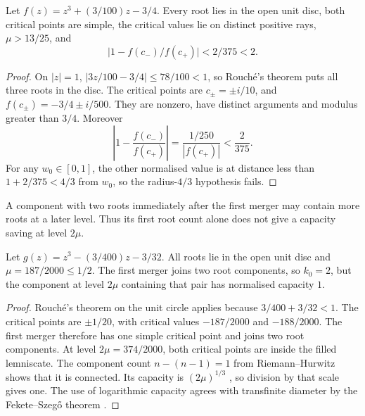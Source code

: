\documentclass[11pt]{article}
\begin{document}
\begin{proposition}
\label{res:sep-or-false}
Let $f(z)=z^3+(3/100)z-3/4$.  Every root lies in the open unit disc, both
critical points are simple, the critical values lie on distinct positive
rays, $\mu>13/25$, and
\[
 \bigl|1-f(c_-)/f(c_+)\bigr|<2/375<2.
\]
\end{proposition}
\begin{proof}
On $|z|=1$, $|3z/100-3/4|\le78/100<1$, so Rouch\'e's theorem puts
all three roots in the disc. The critical points are $c_\pm=\pm i/10$,
and $f(c_\pm)=-3/4\pm i/500$. They are nonzero, have distinct arguments
and modulus greater than $3/4$. Moreover
\[
 \left|1-\frac{f(c_-)}{f(c_+)}\right|
 =\frac{1/250}{|f(c_+)|}<\frac2{375}.
\]
For any $w_0\in[0,1]$, the other normalised value is at distance less
than $1+2/375<4/3$ from $w_0$, so the radius-$4/3$ hypothesis fails.
\end{proof}

A component with two roots immediately after the first merger may
contain more roots at a later level. Thus its first root count alone
does not give a capacity saving at level $2\mu$.

\begin{proposition}
\label{res:arity-not-capacity}
Let $g(z)=z^3-(3/400)z-3/32$. All roots lie in the open unit disc and
$\mu=187/2000\le1/2$. The first merger joins two root components, so
$k_0=2$, but the component at level $2\mu$ containing that pair has
normalised capacity $1$.
\end{proposition}
\begin{proof}
Rouch\'e's theorem on the unit circle applies because
$3/400+3/32<1$. The critical points are $\pm1/20$, with critical values
$-187/2000$ and $-188/2000$. The first merger therefore has one simple
critical point and joins two root components. At level
$2\mu=374/2000$, both critical points are inside the filled lemniscate.
The component count $n-(n-1)=1$ from Riemann--Hurwitz shows that it is
connected. Its capacity is $(2\mu)^{1/3}$
\cite[Theorem~5.2.5]{ransford1995}, so division by that scale gives one.
The use of logarithmic capacity agrees with transfinite diameter by the
Fekete--Szeg\H{o} theorem \cite[p.~153]{ransford1995}.
\end{proof}
\end{document}
